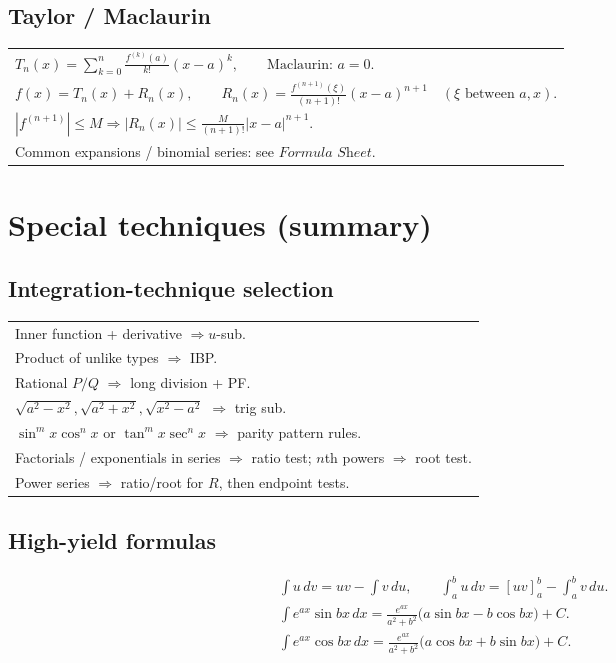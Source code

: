\documentclass[10pt]{article}
\newcommand{\FS}{\textit{Formula Sheet}}
\newcommand{\dx}{\,dx}
\begin{document}
\begin{multicols}{3}
\subsection*{Taylor / Maclaurin}
\begin{tabular}{@{}p{}@{}}
$\displaystyle T_n(x)=\sum_{k=0}^{n}\frac{f^{(k)}(a)}{k!}(x-a)^k,\qquad \text{Maclaurin: }a=0.$\\
$\displaystyle f(x)=T_n(x)+R_n(x),\qquad
R_n(x)=\frac{f^{(n+1)}(\xi)}{(n+1)!}(x-a)^{n+1}\quad (\xi \text{ between }a,x).$\\
$|f^{(n+1)}|\le M \Rightarrow |R_n(x)|\le \displaystyle\frac{M}{(n+1)!}|x-a|^{n+1}.$\\
Common expansions / binomial series: see $\FS$.\\
\end{tabular}
\section*{Special techniques (summary)}
\subsection*{Integration-technique selection}
\begin{tabular}{@{}p{}@{}}
Inner function + derivative $\Rightarrow u$-sub.\\
Product of unlike types $\Rightarrow$ IBP.\\
Rational $P/Q$ $\Rightarrow$ long division + PF.\\
$\sqrt{a^2-x^2},\sqrt{a^2+x^2},\sqrt{x^2-a^2}$ $\Rightarrow$ trig sub.\\
$\sin^m x\cos^n x$ or $\tan^m x\sec^n x$ $\Rightarrow$ parity pattern rules.\\
Factorials / exponentials in series $\Rightarrow$ ratio test; $n$th powers $\Rightarrow$ root test.\\
Power series $\Rightarrow$ ratio/root for $R$, then endpoint tests.\\
\end{tabular}

\subsection*{High-yield formulas}
\begin{align*}
&\int u\,dv=uv-\int v\,du,\qquad \int_a^b u\,dv=[uv]_a^b-\int_a^b v\,du.\\
&\int e^{ax}\sin bx\dx=\frac{e^{ax}}{a^2+b^2}\big(a\sin bx-b\cos bx\big)+C.\\
&\int e^{ax}\cos bx\dx=\frac{e^{ax}}{a^2+b^2}\big(a\cos bx+b\sin bx\big)+C.
\end{align*}


\end{multicols}
\end{document}
